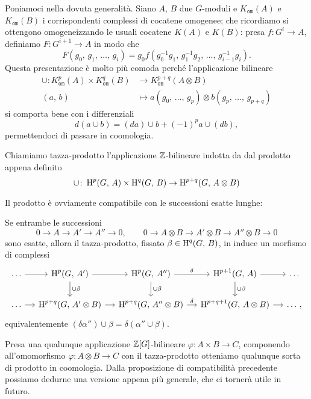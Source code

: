 Poniamoci nella dovuta generalità. Siano $ A, \, B $ due $ G $-moduli e $ K_{\mathtt{om}}(A) $ e $ K_{\mathtt{om}}(B) $ i corrispondenti complessi di cocatene omogenee; che ricordiamo si ottengono omogeneizzando le usuali cocatene $ K(A) $ e $ K(B) $: presa $ f \colon G^i \to A $, definiamo $ F\colon G^{i+1} \to A  $ in modo che
\[ F(g_0, \, g_1, \, \dots, \, g_i) = g_0 f(g_0^{-1}g_1, \, g_1^{-1}g_2, \, \dots, \, g_{i-1}^{-1}g_i). \]
Questa presentazione è molto più comoda perché l'applicazione bilineare
\begin{align*}
	\cup \colon K^p_{\mathtt{om}}(A) \times K^q_{\mathtt{om}}(B) &\to K_{\mathtt{om}}^{p+q}(A \otimes B)\\
	(a, \, b) & \mapsto a(g_0,\, \dots, \, g_p) \otimes b(g_p,\, \dots, \, g_{p+q})
\end{align*}
si comporta bene con i differenziali
\[ d(a \cup b) = (da) \cup b + (-1)^p a \cup (db), \]
permettendoci di passare in coomologia.

\begin{definition}
	Chiamiamo tazza-prodotto l'applicazione $ \mathbb{Z} $-bilineare indotta da dal prodotto appena definito
	\[ \cup \colon \operatorname{H}^p(G, \, A) \times \operatorname{H}^q(G, \, B) \to \operatorname{H}^{p+q}(G, \, A \otimes B)  \]
\end{definition}

Il prodotto è ovviamente compatibile con le successioni esatte lunghe:

\begin{proposition}\label{cup1}
	Se entrambe le successioni
	\[ 0 \to A \to A' \to A'' \to 0, \qquad 0 \to A \otimes B \to A'\otimes B \to A''\otimes B \to 0 \]
	sono esatte, allora il tazza-prodotto, fissato $ \beta \in \operatorname{H}^q(G, \, B) $, in induce un morfismo di complessi
	\[\begin{tikzcd}[column sep = small]
	\dots \rar
	& \HH^{p}(G, \, A') \dar["\cup\beta"] \rar 
	& \HH^{p}(G, \, A'') \rar["\delta"] \dar["\cup\beta"]
	& \HH^{p+1}(G, \, A) \rar \dar["\cup\beta"]
	&\dots  \\
	\dots \rar
	& \HH^{p+q}(G, \, A'\otimes B) \rar
	& \HH^{p+q}(G, \, A''\otimes B) \rar["\delta"]
	& \HH^{p+q+1}(G, \, A\otimes B) \rar &\dots \, , \end{tikzcd}\]
	equivalentemente $ (\delta\alpha'') \cup \beta = \delta (\alpha'' \cup \beta) $.
\end{proposition}

Presa una qualunque applicazione $ \mathbb{Z}[G] $-bilineare $ \varphi\colon A \times B \to C $, componendo all'omomorfismo $ \varphi\colon A \otimes B \to C  $ con il tazza-prodotto otteniamo qualunque sorta di prodotto in coomologia. Dalla proposizione di compatibilità precedente possiamo dedurne una versione appena più generale, che ci tornerà utile in futuro.

